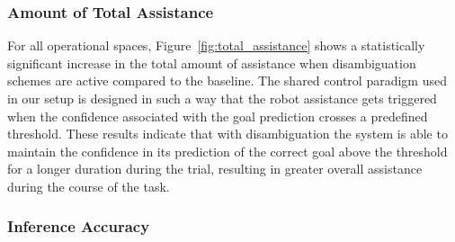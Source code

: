 \documentclass[conference]{IEEEtran}
\begin{document}
\subsubsection{Amount of Total Assistance}

For all operational spaces, Figure~\ref{fig:total_assistance} shows a statistically significant increase in the total amount of assistance when disambiguation schemes are active compared to the baseline.
 The shared control paradigm used in our setup is designed in such a way that the robot assistance gets triggered when the confidence associated with the goal prediction crosses a predefined threshold. These results indicate that with disambiguation the system is able to maintain the confidence in its prediction of the correct goal above the threshold for a longer duration during the trial, resulting in greater overall assistance during the course of the task. 

\subsubsection{Inference Accuracy}
\end{document}
